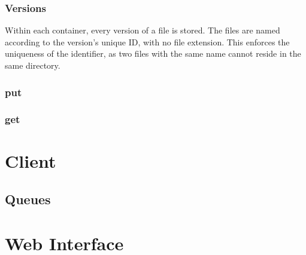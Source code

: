 \subsubsection{Versions}

Within each container, every version of a file is stored. The files are named
according to the version's unique ID, with no file extension. This enforces the
uniqueness of the identifier, as two files with the same name cannot reside in
the same directory.

\subsubsection{put}

\subsubsection{get}

\section{Client}

\subsection{Queues}

\section{Web Interface}
\label{sec:impl-web-interface}
